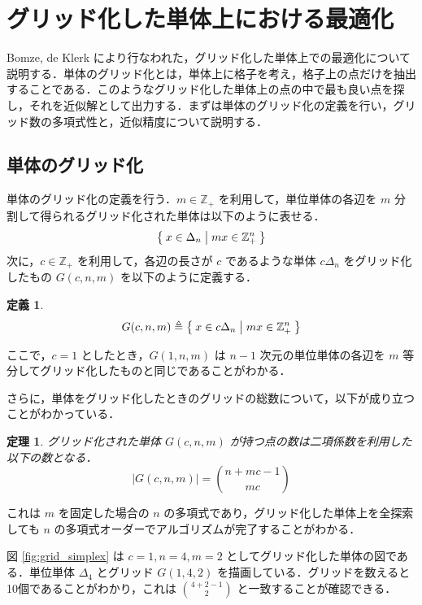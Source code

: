 \documentclass[a4paper,11pt]{jreport}
\newtheorem{definition}{定義}
\newtheorem{theorem}{定理}
\begin{document}
\section{グリッド化した単体上における最適化} \label{sec:gridize_simplex}
Bomze, de Klerk \cite{bomze} により行なわれた，グリッド化した単体上での最適化について説明する．単体のグリッド化とは，単体上に格子を考え，格子上の点だけを抽出することである．このようなグリッド化した単体上の点の中で最も良い点を探し，それを近似解として出力する．まずは単体のグリッド化の定義を行い，グリッド数の多項式性と，近似精度について説明する．\par

\subsection{単体のグリッド化}

単体のグリッド化の定義を行う．$ m \in \mathbb{Z}_+ $ を利用して，単位単体の各辺を $ m $ 分割して得られるグリッド化された単体は以下のように表せる．
$$ \Set{ x \in \Delta_n | mx \in \mathbb{Z}_+^n } $$
次に，$ c \in \mathbb{Z}_+ $ を利用して，各辺の長さが $ c $ であるような単体 $ c \Delta_n $ をグリッド化したもの $ G(c, n, m) $ を以下のように定義する．

\begin{definition}
$$ G(c, n, m) \triangleq \Set{x \in c \Delta_n | mx \in \mathbb{Z}_+^n} $$
\end{definition}

ここで，$ c = 1 $ としたとき，$ G(1, n, m) $ は $ n - 1 $ 次元の単位単体の各辺を $ m $ 等分してグリッド化したものと同じであることがわかる．\par
さらに，単体をグリッド化したときのグリッドの総数について，以下が成り立つことがわかっている．

\begin{theorem} \label{thm:n_grid}
グリッド化された単体 $ G(c, n, m) $ が持つ点の数は二項係数を利用した以下の数となる．
$$ | G(c, n, m) | = \binom{n + mc - 1}{mc} $$
\end{theorem}

これは $ m $ を固定した場合の $ n $ の多項式であり，グリッド化した単体上を全探索しても $ n $ の多項式オーダーでアルゴリズムが完了することがわかる．\par
図 \ref{fig:grid_simplex} は $ c=1, n=4, m=2 $ としてグリッド化した単体の図である．単位単体 $ \Delta_4 $ とグリッド $ G(1, 4, 2) $ を描画している．グリッドを数えると10個であることがわかり，これは $ \binom{4 + 2 - 1}{2} $ と一致することが確認できる．\par
\end{document}
